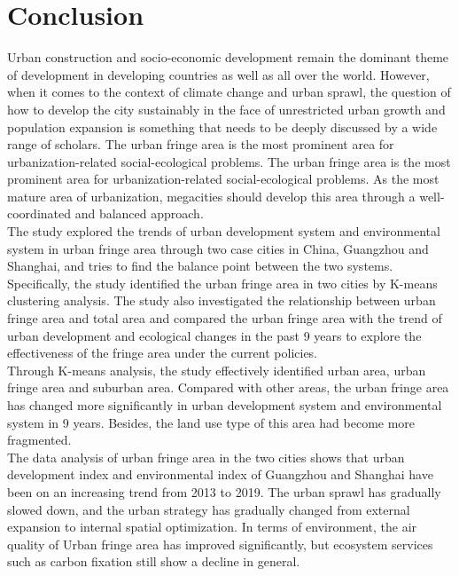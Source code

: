 \section{Conclusion}
Urban construction and socio-economic development remain the dominant theme of development in developing countries as well as all over the world. However, when it comes to the context of climate change and urban sprawl, the question of how to develop the city sustainably in the face of unrestricted urban growth and population expansion is something that needs to be deeply discussed by a wide range of scholars. The urban fringe area is the most prominent area for urbanization-related social-ecological problems. The urban fringe area is the most prominent area for urbanization-related social-ecological problems. As the most mature area of urbanization, megacities should develop this area through a well-coordinated and balanced approach.\\

The study explored the trends of urban development system and environmental system in urban fringe area through two case cities in China, Guangzhou and Shanghai, and tries to find the balance point between the two systems.\\

Specifically, the study identified the urban fringe area in two cities by K-means clustering analysis. The study also investigated the relationship between urban fringe area and total area and compared the urban fringe area with the trend of urban development and ecological changes in the past 9 years to explore the effectiveness of the fringe area under the current policies.\\

Through K-means analysis, the study effectively identified urban area, urban fringe area and suburban area. Compared with other areas, the urban fringe area has changed more significantly in urban development system and environmental system in 9 years. Besides, the land use type of this area had become more fragmented.\\

The data analysis of urban fringe area in the two cities shows that urban development index and environmental index of Guangzhou and Shanghai have been on an increasing trend from 2013 to 2019. The urban sprawl has gradually slowed down, and the urban strategy has gradually changed from external expansion to internal spatial optimization. In terms of environment, the air quality of Urban fringe area has improved significantly, but ecosystem services such as carbon fixation still show a decline in general.\\

